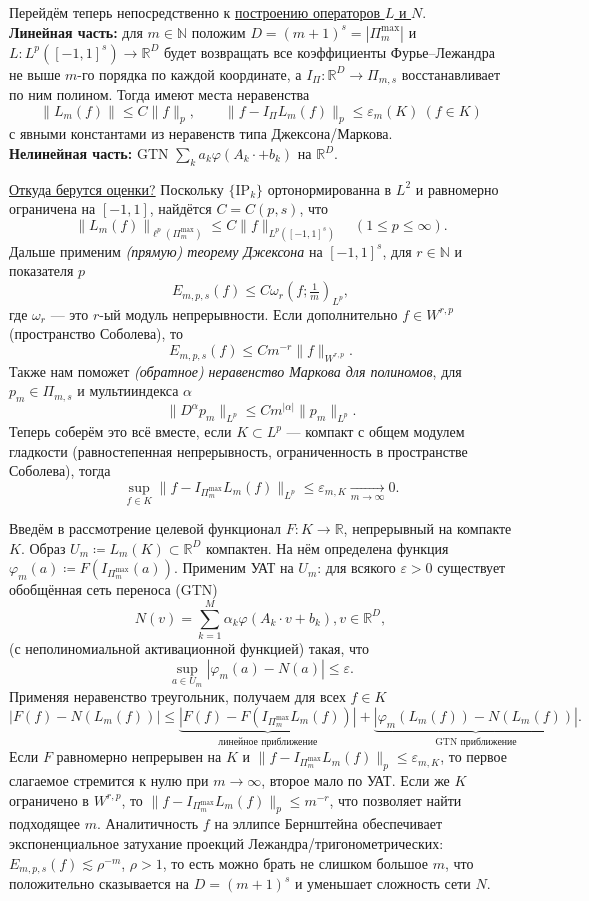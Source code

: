 \documentclass[12pt]{article}
\begin{document}
Перейдём теперь непосредственно к \underline{построению операторов \(L\) и \(N\)}.\\
\textbf{Линейная часть:} для \(m \in \mathbb{N}\) положим \(D = (m + 1)^s = |\Pi_m^{\max}|\) и \(L\colon L^p([-1, 1]^s) \to \mathbb{R}^D\) будет возвращать все коэффициенты Фурье--Лежандра не выше \(m\)-го порядка по каждой координате, а \(I_\Pi\colon \mathbb{R}^D \to \Pi_{m, s}\) восстанавливает по ним полином.
Тогда имеют места неравенства
\[\|L_m(f)\| \le C \|f\|_p, \qquad \|f - I_\Pi L_m(f)\|_p \le \varepsilon_m(K) \ (f \in K)\]
с явными константами из неравенств типа Джексона/Маркова.\\
\textbf{Нелинейная часть:} GTN \(\sum_k a_k \varphi(A_k \cdot + b_k)\) на \(\mathbb{R}^D\).

\underline{Откуда берутся оценки?}
Поскольку \(\{\mathrm{IP}_k\}\) ортонормированна в \(L^2\) и равномерно ограничена на \([-1, 1]\), найдётся \(C = C(p,s)\), что
\[\|L_m(f)\|_{\ell^p(\Pi_m^{\max})} \le C \|f\|_{L^p([-1,1]^s)} \quad (1 \leq p \leq \infty).\]
Дальше применим \emph{(прямую) теорему Джексона} на \([-1, 1]^s\), для \(r \in \mathbb{N}\) и показателя \(p\)
\[E_{m,p,s}(f) \le C \omega_r \left( f; \tfrac{1}{m} \right)_{L^p},\]
где \(\omega_r\) --- это \(r\)-ый модуль непрерывности.
Если дополнительно \(f \in W^{r, p}\) (пространство Соболева), то
\[E_{m,p,s}(f) \le C m^{-r} \|f\|_{W^{r,p}}.\]
Также нам поможет \emph{(обратное) неравенство Маркова для полиномов}, для \(p_m \in \Pi_{m, s}\) и мультииндекса \(\alpha\)
\[\|D^\alpha p_m\|_{L^p} \le C m^{|\alpha|} \|p_m\|_{L^p}.\]
Теперь соберём это всё вместе, если \(K \subset L^p\) --- компакт с общем модулем гладкости (равностепенная непрерывность, ограниченность в пространстве Соболева), тогда
\[\sup_{f \in K} \|f - I_{\Pi_m^{\max}} L_m(f)\|_{L^p} \leq \varepsilon_{m,K} \xrightarrow[m \to \infty]{} 0.\]

Введём в рассмотрение целевой функционал \(F\colon K \to \mathbb{R}\), непрерывный на компакте \(K\).
Образ \(U_m \coloneq L_m(K) \subset \mathbb{R}^D\) компактен.
На нём определена функция \(\varphi_m(a) \coloneq F(I_{\Pi_m^{\max}}(a))\).
Применим УАТ на \(U_m\): для всякого \(\varepsilon > 0\) существует обобщённая сеть переноса (GTN)
\[N(v) = \sum_{k = 1}^M \alpha_k\varphi(A_k\cdot v + b_k), v \in \mathbb{R}^D,\]
(с неполиномиальной активационной функцией) такая, что
\[\sup_{a \in U_m}|\varphi_m(a) - N(a)| \le \varepsilon.\]
Применяя неравенство треугольник, получаем для всех \(f \in K\)
\[|F(f) - N(L_m(f))| \le \underbrace{|F(f) - F(I_{\Pi_m^{\max}}L_m(f))|}_{\text{линейное приближение}} + \underbrace{|\varphi_m(L_m(f)) - N(L_m(f))|}_{\text{GTN приближение}}.\]
Если \(F\) равномерно непрерывен на \(K\) и \(\|f - I_{\Pi_m^{\max}}L_m(f)\|_p \le \varepsilon_{m, K}\), то первое слагаемое стремится к нулю при \(m \to \infty\), второе мало по УАТ.
Если же \(K\) ограничено в \(W^{r, p}\), то \(\|f - I_{\Pi_m^{\max}}L_m(f)\|_p \le m^{-r}\), что позволяет найти подходящее \(m\).
Аналитичность \(f\) на эллипсе Бернштейна обеспечивает экспоненциальное затухание проекций Лежандра/тригонометрических: \(E_{m,p,s}(f) \lesssim \rho^{-m}\), \(\rho > 1\), то есть можно брать не слишком большое \(m\), что положительно сказывается на \(D = (m + 1)^s\) и уменьшает сложность сети \(N\).
\end{document}
